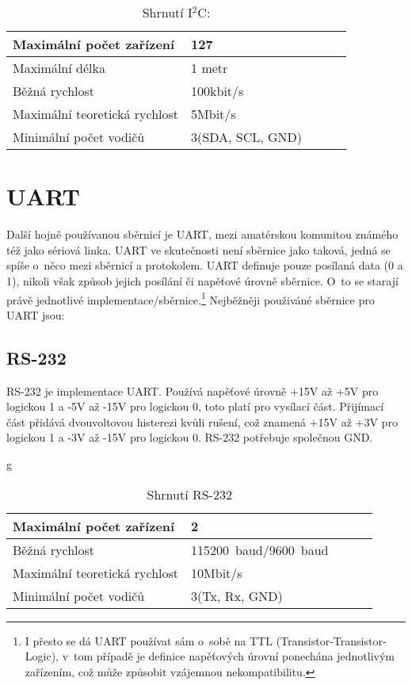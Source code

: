 \begin{table}[h]
	
	\centering
	\begin{tabular}{|l|l|l|l|l|} \hline
		Maximální počet zařízení      & 127              \\ \hline
		Maximální délka               & 1 metr           \\ \hline
		Běžná rychlost                & 100kbit/s        \\ \hline
		Maximální teoretická rychlost & 5Mbit/s          \\ \hline
		Minimální počet vodičů        & 3(SDA, SCL, GND) \\ \hline
	\end{tabular}
	\caption{Shrnutí I$^{2}$C:}
\end{table}



\section{UART}
Další hojně používanou sběrnicí je UART, mezi amatérskou komunitou známého též jako sériová linka.
UART ve skutečnosti není sběrnice jako taková, jedná se spíše o~něco mezi sběrnicí a protokolem.
UART definuje pouze posílaná data (0 a 1), nikoli však způsob jejich posílání či napěťové úrovně sběrnice.
O~to se starají právě jednotlivé implementace/sběrnice.\footnote{I přesto se dá UART používat sám o~sobě na TTL (Transistor-Transistor-Logic), v~tom případě je definice napěťových úrovní ponechána jednotlivým zařízením, což může způsobit vzájemnou nekompatibilitu.}
Nejběžněji použiváné sběrnice pro UART jsou:
\subsection{RS-232} %
RS-232 je implementace UART.
Používá napěťové úrovně +15V až +5V pro logickou 1 a -5V až -15V pro logickou 0, toto platí pro vysílací část.
Přijímací část přidává dvouvoltovou histerezi kvůli rušení, což znamená +15V až +3V pro logickou 1 a -3V až -15V pro logickou 0.
RS-232 potřebuje společnou GND.\cite{RS-232}
\begin{table}[h]g
	
	\centering
	\begin{tabular}{|l|l|l|l|l|} \hline
		Maximální počet zařízení      & 2              \\ \hline
		Běžná rychlost                & 115200~baud/9600~baud        \\ \hline
		Maximální teoretická rychlost & 10Mbit/s       \\ \hline
		Minimální počet vodičů        & 3(Tx, Rx, GND) \\ \hline
	\end{tabular}
	\caption{Shrnutí RS-232}
\end{table}
